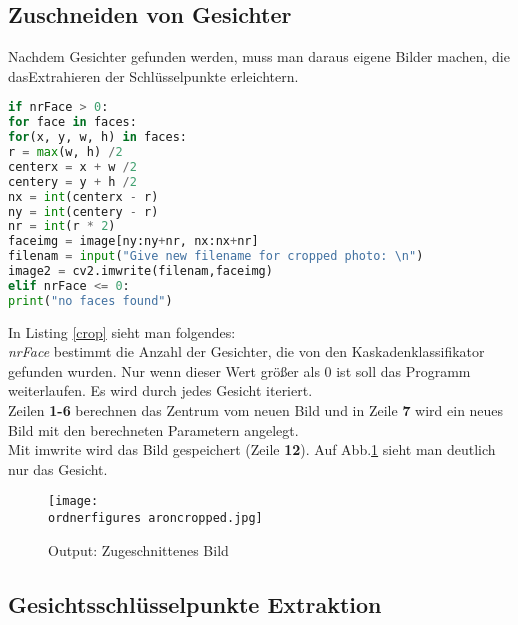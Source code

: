 	
\subsection{Zuschneiden von Gesichter}

Nachdem Gesichter gefunden werden, muss man daraus eigene Bilder machen, die dasExtrahieren der Schlüsselpunkte erleichtern.\\  

\begin{lstlisting}[language=python,caption=Code Abschnitt: Gesicht
Zuschneiden,label=crop]
if nrFace > 0:
for face in faces:
for(x, y, w, h) in faces:
r = max(w, h) /2 
centerx = x + w /2 
centery = y + h /2
nx = int(centerx - r) 
ny = int(centery - r) 
nr = int(r * 2) 
faceimg = image[ny:ny+nr, nx:nx+nr] 
filenam = input("Give new filename for cropped photo: \n")
image2 = cv2.imwrite(filenam,faceimg)
elif nrFace <= 0:
print("no faces found")

\end{lstlisting}

In Listing \ref{crop} sieht man folgendes:\\

\textit{nrFace} bestimmt die Anzahl der Gesichter, die von den
Kaskadenklassifikator gefunden wurden. 
Nur wenn dieser Wert größer als 0 ist soll das Programm weiterlaufen.  
Es wird durch jedes Gesicht iteriert.
\\

Zeilen \textbf{1-6} berechnen das Zentrum vom neuen Bild und in Zeile \textbf{7}
wird ein neues Bild mit den berechneten Parametern angelegt.\\
Mit imwrite wird das Bild gespeichert (Zeile \textbf{12}). 
Auf Abb.\ref{fig:aroncropped} sieht man deutlich nur das Gesicht.
\\

\begin{figure}[H]
	\centering
	\texttt{[image: \\ordnerfigures aroncropped.jpg]}
	\caption{Output: Zugeschnittenes Bild}
	\label{fig:aroncropped}
\end{figure}

	
\subsection{Gesichtsschlüsselpunkte Extraktion}
\label{gspex}

